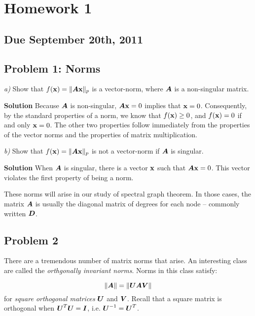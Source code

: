 \documentclass{article}
\begin{document}
 
\hypertarget{homework_1_1}{}\section*{{Homework 1}}\label{homework_1_1}

\hypertarget{due_september_20th_2011_2}{}\subsection*{{Due September 20th, 2011}}\label{due_september_20th_2011_2}

\hypertarget{problem_1_norms_3}{}\subsection*{{Problem 1: Norms}}\label{problem_1_norms_3}

\emph{a)} Show that $f(\boldsymbol{\mathrm{x}}) = \|\boldsymbol{A} \boldsymbol{\mathrm{x}}\|_p$ is a vector-norm, where $\boldsymbol{A}$ is a non-singular matrix.

\textbf{Solution} Because $\boldsymbol{A}$ is non-singular, $\boldsymbol{A} \boldsymbol{\mathrm{x}} = 0$ implies that $\boldsymbol{\mathrm{x}} = 0$. Consequently, by the standard properties of a norm, we know that $f(\boldsymbol{\mathrm{x}}) \ge 0$, and $f(\boldsymbol{\mathrm{x}}) = 0$ if and only $\boldsymbol{\mathrm{x}} = 0$. The other two properties follow immediately from the properties of the vector norms and the properties of matrix multiplication.

\emph{b)} Show that $f(\boldsymbol{\mathrm{x}}) = \|\boldsymbol{A} \boldsymbol{\mathrm{x}}\|_p$ is not a vector-norm if $\boldsymbol{A}$ is singular.

\textbf{Solution} When $\boldsymbol{A}$ is singular, there is a vector $\boldsymbol{\mathrm{x}}$ such that $\boldsymbol{A} \boldsymbol{\mathrm{x}} = 0$. This vector violates the first property of being a norm.

These norms will arise in our study of spectral graph theorem. In those cases, the matrix $\boldsymbol{A}$ is usually the diagonal matrix of degrees for each node --{} commonly written $\boldsymbol{D}$.

\hypertarget{problem_2_4}{}\subsection*{{Problem 2}}\label{problem_2_4}

There are a tremendous number of matrix norms that arise. An interesting class are called the \emph{orthgonally invariant norms}. Norms in this class satisfy:

\begin{displaymath}
\|\boldsymbol{A}\| = \|\boldsymbol{U} \boldsymbol{A} \boldsymbol{V}\|
\end{displaymath}
for \emph{square orthogonal matrices} $\boldsymbol{U}$ and $\boldsymbol{V}$. Recall that a square matrix is orthogonal when $\boldsymbol{U}^T \boldsymbol{U} = \boldsymbol{I}$, i.e. $\boldsymbol{U}^{-1} = \boldsymbol{U}^T$.
\end{document}
